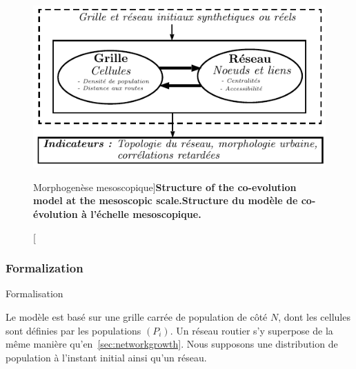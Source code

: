 \begin{figure}
	\includegraphics[width=\linewidth]{Figures/MesoCoEvol/mesocoevol_fr.pdf}
	\caption[Morphogenesis at the mesoscopic scale][Morphogenèse mesoscopique]{\textbf{Structure of the co-evolution model at the mesoscopic scale.}\label{fig:mesocoevolmodel:workflow}}{\textbf{Structure du modèle de co-évolution à l'échelle mesoscopique.}\label{fig:mesocoevolmodel:workflow}}
\end{figure}



\subsubsection{Formalization}{Formalisation}


Le modèle est basé sur une grille carrée de population de côté $N$, dont les cellules sont définies par les populations $(P_i)$. Un réseau routier s'y superpose de la même manière qu'en~\ref{sec:networkgrowth}. Nous supposons une distribution de population à l'instant initial ainsi qu'un réseau.


